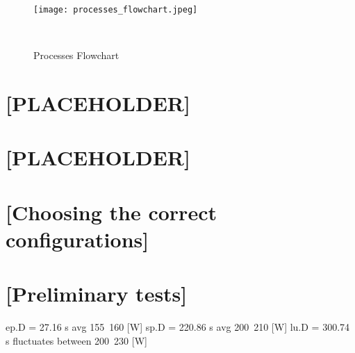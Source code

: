 \begin{figure}[hbtp]
    \centering
    \texttt{[image: processes\_flowchart.jpeg]}
    \caption{Processes Flowchart}~\label{fig:processes_flowchart.jpeg}
\end{figure}

\section{[PLACEHOLDER]}
\section{[PLACEHOLDER]}
\section{[Choosing the correct configurations]}
\section{[Preliminary tests]}









ep.D = 27.16 s          avg 155~160 [W]
sp.D = 220.86 s         avg 200~210 [W]
lu.D = 300.74 s         fluctuates between 200~230 [W]